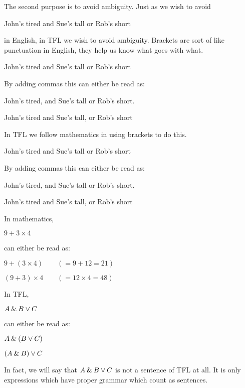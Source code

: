 The second purpose is to avoid ambiguity. 
Just as we wish to avoid
\begin{center} 
John's tired and Sue's tall or Rob's short
\end{center}
in English, in TFL we wish to avoid ambiguity.
Brackets are sort of like punctuation in English, they help us know what goes with what. 
\begin{earg}
\item[\ex{engamb}] John's tired and Sue's tall or Rob's short
\end{earg}
By adding commas this can either be read as:
\begin{earg}
\item[\ex{engamb1}] John's tired, and Sue's tall or Rob's short.
\item[\ex{engamb2}] John's tired and Sue's tall, or Rob's short
\end{earg}
In TFL we follow mathematics in using brackets to do this. 
\begin{earg}
\item[\ex{engamb}] John's tired and Sue's tall or Rob's short
\end{earg}
By adding commas this can either be read as:
\begin{earg}
\item[\ex{engamb1}] John's tired, and Sue's tall or Rob's short.
\item[\ex{engamb2}] John's tired and Sue's tall, or Rob's short
\end{earg}
In mathematics,
\begin{earg}
\item[\ex{mathamb}] $9 + 3 \times 4$
\end{earg}
can either be read as:
\begin{earg}
\item[\ex{mathamb1}] $9 + (3 \times 4) \qquad(=9+12=21)$
\item[\ex{mathamb2}] $(9+3) \times 4 \qquad(=12\times 4=48)$
\end{earg}
In TFL,
\begin{earg}
\item[\ex{mathamb}] $A\mathbin{\&} B\vee C$
\end{earg}
can either be read as:
\begin{earg}
\item[\ex{mathamb1}] $A\mathbin{\&} (B\vee C)$
\item[\ex{mathamb2}] $(A\mathbin{\&} B)\vee C$
\end{earg}
In fact, we will say that $A\mathbin{\&} B\vee C$ is not a sentence of TFL at all. It is only expressions which have proper grammar which count as sentences. 
	
